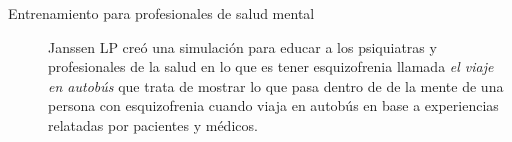 \begin{description}
\item[Entrenamiento para profesionales de salud mental] Janssen LP creó una
	simulación para educar a los psiquiatras y profesionales de la salud en
	lo que es tener esquizofrenia llamada \emph{el viaje en autobús} que
	trata de mostrar lo que pasa dentro de de la mente de una persona con
	esquizofrenia cuando viaja en autobús en base a experiencias relatadas
	por pacientes y médicos\cite{mantovani:vr}. 

\end{description}
